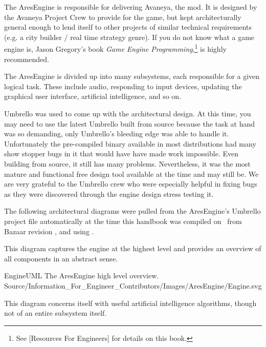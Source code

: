 

The AresEngine is responsible for delivering Avaneya, the mod. It is designed by the Avaneya Project Crew to provide for the game, but kept architecturally general enough to lend itself to other projects of similar technical requirements (e.g. a city builder / real time strategy genre). If you do not know what a game engine is, Jason Gregory's book {\it Game Engine Programming},\footnote{See [Resources For Engineers] for details on this book.} is highly recommended.

The AresEngine is divided up into many subsystems, each responsible for a given logical task. These include audio, responding to input devices, updating the graphical user interface, artificial intelligence, and so on.

Umbrello was used to come up with the architectural design. At this time, you may need to use the latest Umbrello built from source because the task at hand was so demanding, only Umbrello's bleeding edge was able to handle it. Unfortunately the pre-compiled binary available in most distributions had many show stopper bugs in it that would have have made work impossible. Even building from source, it still has many problems. Nevertheless, it was the most mature and functional free design tool available at the time and may still be. We are very grateful to the Umbrello crew who were especially helpful in fixing bugs as they were discovered through the engine design stress testing it.

The following architectural diagrams were pulled from the AresEngine's Umbrello project file automatically at the time this handbook was compiled on \currentdate\ from Bazaar revision \BazaarRevision, and using .

This diagram captures the engine at the highest level and provides an overview of all components in an abstract sense.

\FullPageLandscapeDiagram
    {EngineUML}
    {The AresEngine high level overview.}
    {Source/Information_For_Engineer_Contributors/Images/AresEngine/Engine.svg}

This diagram concerns itself with useful artificial intelligence algorithms, though not of an entire subsystem itself.

